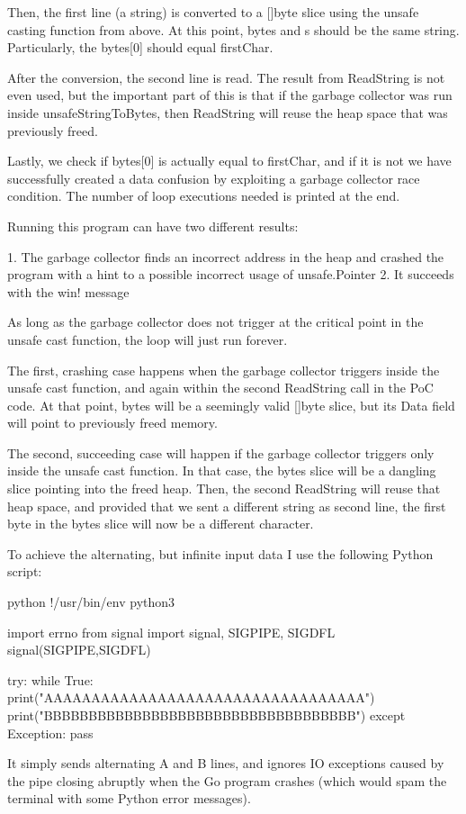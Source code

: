 Then, the first line (a string) is converted to a []byte slice using the unsafe casting function from above. At this
point, bytes and s should be the same string. Particularly, the bytes[0] should equal firstChar.

After the conversion, the second line is read. The result from ReadString is not even used, but the important part of
this is that if the garbage collector was run inside unsafeStringToBytes, then ReadString will reuse the heap space
that was previously freed.

Lastly, we check if bytes[0] is actually equal to firstChar, and if it is not we have successfully created a data
confusion by exploiting a garbage collector race condition. The number of loop executions needed is printed at the end.

Running this program can have two different results:

 1. The garbage collector finds an incorrect address in the heap and crashed the program with a hint to a possible
    incorrect usage of unsafe.Pointer
 2. It succeeds with the win! message

As long as the garbage collector does not trigger at the critical point in the unsafe cast function, the loop will just
run forever.

The first, crashing case happens when the garbage collector triggers inside the unsafe cast function, and again within
the second ReadString call in the PoC code. At that point, bytes will be a seemingly valid []byte slice, but its
Data field will point to previously freed memory.

The second, succeeding case will happen if the garbage collector triggers only inside the unsafe cast function. In that
case, the bytes slice will be a dangling slice pointing into the freed heap. Then, the second ReadString will reuse
that heap space, and provided that we sent a different string as second line, the first byte in the bytes slice will
now be a different character.

To achieve the alternating, but infinite input data I use the following Python script:

python
!/usr/bin/env python3

import errno
from signal import signal, SIGPIPE, SIGDFL
signal(SIGPIPE,SIGDFL)

try:
    while True:
        print("AAAAAAAAAAAAAAAAAAAAAAAAAAAAAAAAAA")
        print("BBBBBBBBBBBBBBBBBBBBBBBBBBBBBBBBBBB")
except Exception:
    pass


It simply sends alternating A and B lines, and ignores IO exceptions caused by the pipe closing abruptly when the
Go program crashes (which would spam the terminal with some Python error messages).

